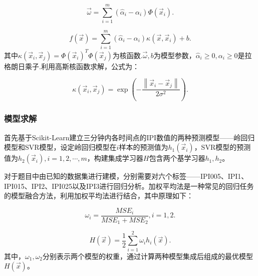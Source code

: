 \begin{enumerate}
	\begin{equation}
		\overrightarrow{\omega }=\sum\limits_{i=1}^{m}{\left( {{\widehat{\alpha }}_{i}}-{{\alpha }_{i}} \right)\Phi \left( {{\overrightarrow{x}}_{i}} \right)}.
	\end{equation}
	
	\begin{equation}
		f\left( \overrightarrow{x} \right)=\sum\limits_{i=1}^{m}{\left( {{\widehat{\alpha }}_{i}}-{{\alpha }_{i}} \right)\kappa \left( \overrightarrow{x},{{\overrightarrow{x}}_{i}} \right)}+b.
	\end{equation}
	其中$\kappa \left( {{\overrightarrow{x}}_{i}},{{\overrightarrow{x}}_{j}} \right)=\Phi {{\left( {{\overrightarrow{x}}_{i}} \right)}^{T}}\Phi \left( {{\overrightarrow{x}}_{j}} \right)$为核函数.$\overrightarrow{\omega },b$为模型参数，${{\widehat{\alpha }}_{i}}\ge 0,{{\alpha }_{i}}\ge 0$是拉格朗日乘子.利用高斯核函数求解，公式为：
	
	\begin{equation}
		\kappa \left( {{\overrightarrow{x}}_{i}},{{\overrightarrow{x}}_{j}} \right)=\exp \left( -\frac{\left\| {{\overrightarrow{x}}_{i}}-{{\overrightarrow{x}}_{j}} \right\|}{2{{\sigma }^{2}}} \right).
	\end{equation}
	
\end{enumerate}





\subsubsection{模型求解}

首先基于Scikit-Learn建立三分钟内各时间点的IPI数值的两种预测模型——岭回归模型和SVR模型，设定岭回归模型在$i$样本的预测值为${{h}_{1}}({{\overrightarrow{x}}_{i}})$，SVR模型的预测值为${{h}_{2}}({{\overrightarrow{x}}_{i}}),i=1,2,\cdots ,m$，构建集成学习器$H$包含两个基学习器{${{h}_{1}},{{h}_{2}}$}。


对于题目中由已知的数据集进行建模，分别需要对六个标签——IPI005、IPI1、IPI015、IPI2、IPI025以及IPI3进行回归分析。加权平均法是一种常见的回归任务的模型融合方法，利用加权平均法进行结合，其中原理如下：

\begin{equation}
	{{\omega }_{i}}=\frac{MS{{E}_{i}}}{MS{{E}_{1}}+MS{{E}_{2}}},i=1,2.
\end{equation}


\begin{equation}
	H(\overrightarrow{x})=\frac{1}{2}\sum\limits_{i=1}^{2}{{{\omega }_{i}}{{h}_{i}}(\overrightarrow{x})}.
\end{equation}
其中，${{\omega }_{1}},{{\omega }_{2}}$分别表示两个模型的权重，通过计算两种模型集成后组成的最优模型$H(\overrightarrow{x})$。

